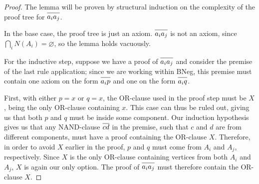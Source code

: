 \begin{proof}
  The lemma will be proven by structural induction on the complexity of the proof tree for $\ol{a_ia_j}$.

  In the base case, the proof tree is just an axiom.
  $\ol{a_ia_j}$ is not an axiom, since $\bigcap_i N(A_i) = \varnothing$, so the lemma holds vacuously.

  For the inductive step, suppose we have a proof of $\ol{a_ia_j}$ and consider the premise of the last rule application;
  since we are working within BNeg, this premise must contain one axiom on the form $\ol{a_ip}$ and one on the form $\ol{a_iq}$.\par
  \begin{figure}[!h]
    \centering
    \begin{prooftree*}
      \Hypo{\dots}
      \Hypo{\dots}
      \Hypo{\dots}
    \end{prooftree*}
    \caption{}
    \label{fig:ab_proof_bc}
  \end{figure}
  \FloatBarrier
  First, with either $p = x$ or $q = x$, the OR-clause used in the proof step must be $X$, being the only OR-clause containing $x$.
  This case can thus be ruled out, giving us that both $p$ and $q$ must be inside some component.
  Our induction hypothesis gives us that any NAND-clause $\ol{cd}$ in the premise, such that $c$ and $d$ are from different components, must have a proof containing the OR-clause $X$.
  Therefore, in order to avoid $X$ earlier in the proof, $p$ and $q$ must come from $A_i$ and $A_j$, respectively.
  Since $X$ is the only OR-clause containing vertices from both $A_i$ and $A_j$, $X$ is again our only option.
  The proof of $\ol{a_ia_j}$ must therefore contain the OR-clause $X$.
\end{proof}
